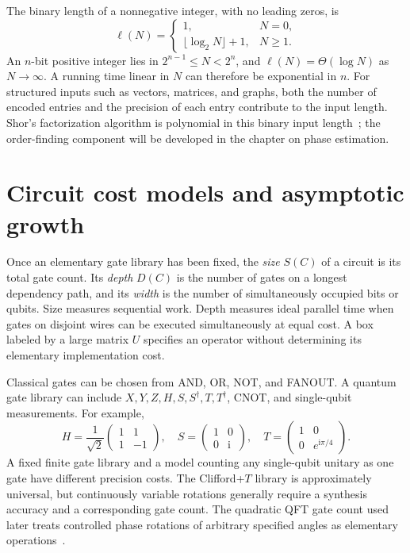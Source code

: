\documentclass[11pt,oneside,openany]{book}
\newcommand{\ii}{\mathrm{i}}
\theoremstyle{definition}
\begin{document}
The binary length of a nonnegative integer, with no leading zeros, is
\begin{equation}
 \ell(N)=\begin{cases}1,&N=0,\\\lfloor\log_2N\rfloor+1,&N\ge1.
 \end{cases}
 \label{eq:bitlength}
\end{equation}
An $n$-bit positive integer lies in $2^{n-1}\le N<2^n$, and $\ell(N)=\Theta(\log N)$ as $N\to\infty$. A running time linear in $N$ can therefore be exponential in $n$. For structured inputs such as vectors, matrices, and graphs, both the number of encoded entries and the precision of each entry contribute to the input length. Shor's factorization algorithm is polynomial in this binary input length~\cite{Shor1997}; the order-finding component will be developed in the chapter on phase estimation.

\section{Circuit cost models and asymptotic growth}
Once an elementary gate library has been fixed, the \emph{size} $S(C)$ of a circuit is its total gate count. Its \emph{depth} $D(C)$ is the number of gates on a longest dependency path, and its \emph{width} is the number of simultaneously occupied bits or qubits. Size measures sequential work. Depth measures ideal parallel time when gates on disjoint wires can be executed simultaneously at equal cost. A box labeled by a large matrix $U$ specifies an operator without determining its elementary implementation cost.

Classical gates can be chosen from AND, OR, NOT, and FANOUT. A quantum gate library can include $X,Y,Z,H,S,S^\dagger,T,T^\dagger$, CNOT, and single-qubit measurements. For example,
\begin{equation}
 H=\frac1{\sqrt2}\begin{pmatrix}1&1\\1&-1\end{pmatrix},\quad
 S=\begin{pmatrix}1&0\\0&\ii\end{pmatrix},\quad
 T=\begin{pmatrix}1&0\\0&e^{\ii\pi/4}\end{pmatrix}.
\end{equation}
A fixed finite gate library and a model counting any single-qubit unitary as one gate have different precision costs. The Clifford+$T$ library is approximately universal, but continuously variable rotations generally require a synthesis accuracy and a corresponding gate count. The quadratic QFT gate count used later treats controlled phase rotations of arbitrary specified angles as elementary operations~\cite{NC2010}.
\end{document}
